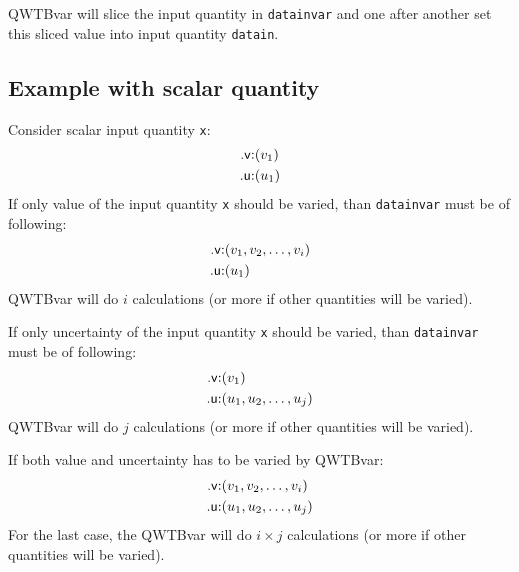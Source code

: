 \documentclass[12pt,a4paper,oneside]{report} %
\newcommand{\li}[1]{\lstinline{#1}}     %
\begin{document}
QWTBvar will slice the input quantity in \li{datainvar} and one after
another set this sliced value into input quantity \li{datain}.

\subsection{Example with scalar quantity}
Consider scalar input quantity \li{x}:
\begin{eqnarray*}
    \text{\textsf{.v}:} & (v_1)\\
    \text{\textsf{.u}:} & (u_1)\\
\end{eqnarray*}
If only value of the input quantity \li{x} should be varied, than
\li{datainvar} must be of following:
\begin{eqnarray*}
    \text{\textsf{.v}:} & (v_1, v_2, \dots, v_i)\\
    \text{\textsf{.u}:} & (u_1)\\
\end{eqnarray*}
QWTBvar will do $i$ calculations (or more if other quantities will be varied).

If only uncertainty of the input quantity \li{x} should be varied, than
\li{datainvar} must be of following:
\begin{eqnarray*}
    \text{\textsf{.v}:} & (v_1)\\
    \text{\textsf{.u}:} & (u_1, u_2, \dots, u_j)\\
\end{eqnarray*}
QWTBvar will do $j$ calculations (or more if other quantities will be varied).

If both value and uncertainty has to be varied by QWTBvar:
\begin{eqnarray*}
    \text{\textsf{.v}:} & (v_1, v_2, \dots, v_i)\\
    \text{\textsf{.u}:} & (u_1, u_2, \dots, u_j)\\
\end{eqnarray*}
For the last case, the QWTBvar will do $i\times j$ calculations (or more if other quantities will be varied).
\end{document}
